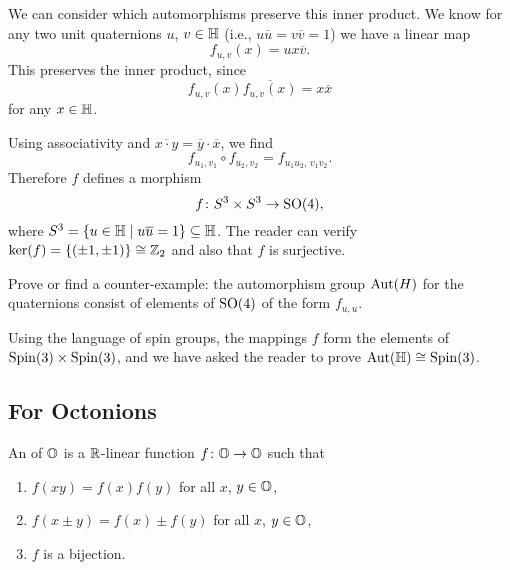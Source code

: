 We can consider which automorphisms preserve this inner product. We know
for any two unit quaternions $u$, $v\in\mathbb{H}$ (i.e.,
$u\overline{u}=v\overline{v}=1$) we have a linear map
\begin{equation}
f_{u,v}(x) = ux\overline{v}.
\end{equation}
This preserves the inner product, since
\begin{equation}
f_{u,v}(x)\overline{f_{u,v}(x)}=x\overline{x}
\end{equation}
for any $x\in\mathbb{H}$.

Using associativity and $\overline{x\cdot y}=\overline{y}\cdot\overline{x}$, we
find
\begin{equation}
f_{u_{1},v_{1}}\circ f_{u_{2},v_{2}} = f_{u_{1}u_{2},\,v_{1}v_{2}}.
\end{equation}
Therefore $f$ defines a morphism
\begin{equation}
f\colon S^{3}\times S^{3}\to\operatorname{SO}(4),
\end{equation}
where $S^{3}=\{u\in\mathbb{H}\mid u\overline{u}=1\}\subseteq\mathbb{H}$. The reader can
verify $\ker(f)=\{(\pm1,\pm1)\}\cong\mathbb{Z}_{2}$ and also that $f$ is
surjective.

\begin{exercise}
Prove or find a counter-example:
the automorphism group $\operatorname{Aut}(H)$ for the quaternions consist of elements
of $\operatorname{SO}(4)$ of the form $f_{u,u}$.
\end{exercise}

\begin{remark}
Using the language of spin groups, the mappings $f$ form the elements of
$\operatorname{Spin}(3)\times\operatorname{Spin}(3)$, and we have asked the reader to prove
$\operatorname{Aut}(\mathbb{H})\cong\operatorname{Spin}(3)$. 
\end{remark}

\subsection{For Octonions}\label{subsec:octonions:automorphisms}

\begin{definition}
An  of $\mathbb{O}$ is a $\mathbb{R}$-linear function
$f\colon\mathbb{O}\to\mathbb{O}$ such that
\begin{enumerate}
\item $f(xy)=f(x)f(y)$ for all $x$, $y\in\mathbb{O}$,
\item $f(x\pm y)=f(x)\pm f(y)$ for all $x$, $y\in\mathbb{O}$,
\item $f$ is a bijection.
\end{enumerate}
\end{definition}

